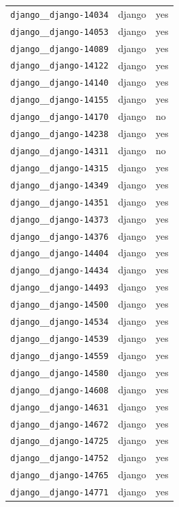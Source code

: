 \begin{longtable}{@{}p{}lp{}@{}}
\texttt{django\_\_django-14034} & django & yes \\
\texttt{django\_\_django-14053} & django & yes \\
\texttt{django\_\_django-14089} & django & yes \\
\texttt{django\_\_django-14122} & django & yes \\
\texttt{django\_\_django-14140} & django & yes \\
\texttt{django\_\_django-14155} & django & yes \\
\texttt{django\_\_django-14170} & django & no \\
\texttt{django\_\_django-14238} & django & yes \\
\texttt{django\_\_django-14311} & django & no \\
\texttt{django\_\_django-14315} & django & yes \\
\texttt{django\_\_django-14349} & django & yes \\
\texttt{django\_\_django-14351} & django & yes \\
\texttt{django\_\_django-14373} & django & yes \\
\texttt{django\_\_django-14376} & django & yes \\
\texttt{django\_\_django-14404} & django & yes \\
\texttt{django\_\_django-14434} & django & yes \\
\texttt{django\_\_django-14493} & django & yes \\
\texttt{django\_\_django-14500} & django & yes \\
\texttt{django\_\_django-14534} & django & yes \\
\texttt{django\_\_django-14539} & django & yes \\
\texttt{django\_\_django-14559} & django & yes \\
\texttt{django\_\_django-14580} & django & yes \\
\texttt{django\_\_django-14608} & django & yes \\
\texttt{django\_\_django-14631} & django & yes \\
\texttt{django\_\_django-14672} & django & yes \\
\texttt{django\_\_django-14725} & django & yes \\
\texttt{django\_\_django-14752} & django & yes \\
\texttt{django\_\_django-14765} & django & yes \\
\texttt{django\_\_django-14771} & django & yes \\

\end{longtable}

